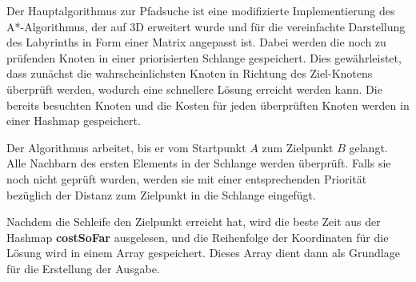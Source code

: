\documentclass[a4paper,10pt,ngerman]{scrartcl}
\begin{document}
Der Hauptalgorithmus zur Pfadsuche ist eine modifizierte Implementierung des A*-Algorithmus, der auf 3D erweitert wurde und für die vereinfachte Darstellung des Labyrinths in Form einer Matrix angepasst ist. Dabei werden die noch zu prüfenden Knoten in einer priorisierten Schlange gespeichert. Dies gewährleistet, dass zunächst die wahrscheinlichsten Knoten in Richtung des Ziel-Knotens überprüft werden, wodurch eine schnellere Lösung erreicht werden kann. Die bereits besuchten Knoten und die Kosten für jeden überprüften Knoten werden in einer Hashmap gespeichert.

Der Algorithmus arbeitet, bis er vom Startpunkt $A$ zum Zielpunkt $B$ gelangt. Alle Nachbarn des ersten Elements in der Schlange werden überprüft. Falls sie noch nicht geprüft wurden, werden sie mit einer entsprechenden Priorität bezüglich der Distanz zum Zielpunkt in die Schlange eingefügt.

Nachdem die Schleife den Zielpunkt erreicht hat, wird die beste Zeit aus der Hashmap \textbf{costSoFar} ausgelesen, und die Reihenfolge der Koordinaten für die Lösung wird in einem Array gespeichert. Dieses Array dient dann als Grundlage für die Erstellung der Ausgabe.
\end{document}

